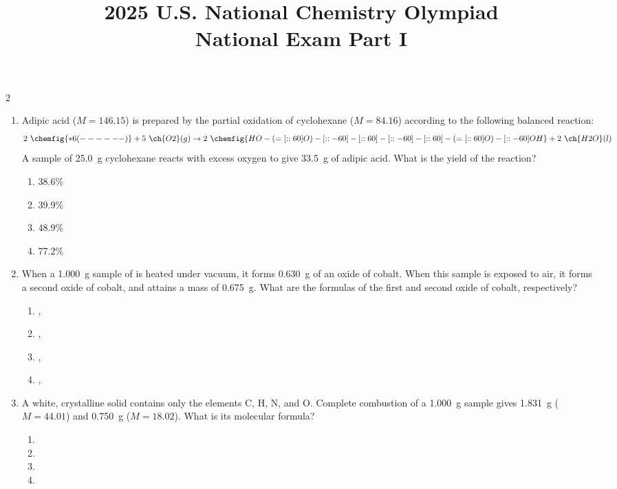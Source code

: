 \documentclass[titlepage,10pt,letterpaper]{article}
\title{2025 U.S. National Chemistry Olympiad\\National Exam Part I}
\date{}
\begin{document}
\maketitle

\begin{multicols}{2}

\begin{enumerate}[leftmargin=*]

\item Adipic acid ($M=146.15$) is prepared by the partial oxidation of cyclohexane ($M=84.16$) according to the following balanced reaction:
\[ 2\ \chemfig{*6(------)} + 5\ \ch{O2}(g) \rightarrow 2\ \chemfig{HO-(=[::60]O)-[::-60]-[::60]-[::-60]-[::60]-(=[::60]O)-[::-60]OH} + 2\ \ch{H2O}(l) \]
A sample of 25.0~g cyclohexane reacts with excess oxygen to give 33.5~g of adipic acid. What is the yield of the reaction?
\begin{enumerate}[label=(\alph*)]
    \item 38.6\%
    \item 39.9\%
    \item 48.9\%
    \item 77.2\%
\end{enumerate}

\item When a 1.000~g sample of  is heated under vacuum, it forms 0.630~g of an oxide of cobalt. When this sample is exposed to air, it forms a second oxide of cobalt, and attains a mass of 0.675~g. What are the formulas of the first and second oxide of cobalt, respectively?
\begin{enumerate}[label=(\alph*)]
    \item {}, 
    \item {}, 
    \item {}, 
    \item {}, 
\end{enumerate}

\item A white, crystalline solid contains only the elements C, H, N, and O. Complete combustion of a 1.000~g sample gives 1.831~g  ($M=44.01$) and 0.750~g  ($M=18.02$). What is its molecular formula?
\begin{enumerate}[label=(\alph*)]
    \item {}
    \item {}
    \item {}
    \item {}
\end{enumerate}


\end{enumerate}
\end{multicols}
\end{document}
